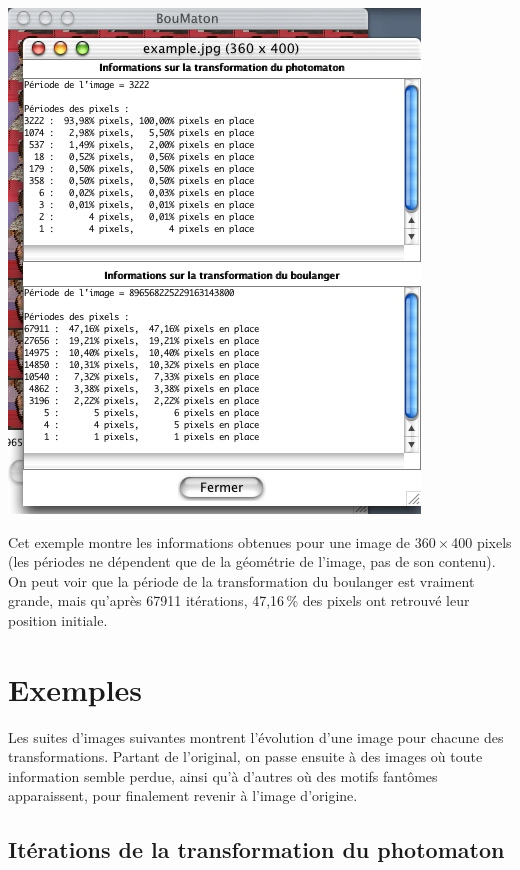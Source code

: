 \documentclass[a4paper]{article}
\newcommand{\picdim}[2]{#1\,\(\times\)\,#2}
\begin{document}
  \begin{center}
    \includegraphics[scale=0.4]{info_exemple_fr}
  \end{center}
  Cet exemple montre les informations obtenues pour une image de 
  \picdim{360}{400} pixels (les périodes ne dépendent que de la 
  géométrie de l'image, pas de son contenu). On peut voir que la 
  période de la transformation du boulanger est vraiment grande, mais 
  qu'après 67911 itérations, 47,16\,\% des pixels ont retrouvé leur 
  position initiale.
  
  \section{Exemples}
  Les suites d'images suivantes montrent l'évolution d'une image pour 
  chacune des transformations. Partant de l'original, on passe 
  ensuite à des images où toute information semble perdue, ainsi qu'à 
  d'autres où des motifs fantômes apparaissent, pour finalement 
  revenir à l'image d'origine.
  
  \subsection{Itérations de la transformation du photomaton}
\end{document}
